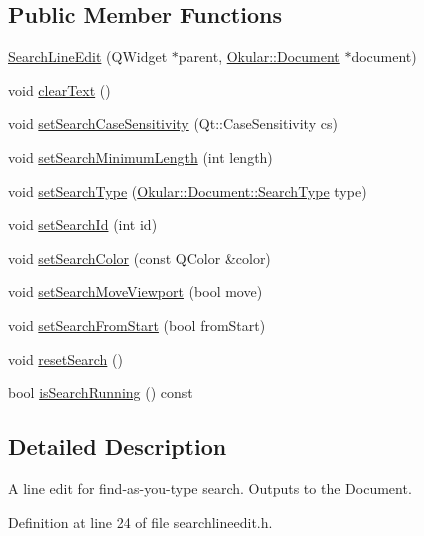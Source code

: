 \subsection*{Public Member Functions}
\begin{DoxyCompactItemize}
\item 
\hyperlink{classSearchLineEdit_a95f47f20abbe33e2085ed00a72ea765b}{Search\+Line\+Edit} (Q\+Widget $\ast$parent, \hyperlink{classOkular_1_1Document}{Okular\+::\+Document} $\ast$document)
\item 
void \hyperlink{classSearchLineEdit_a0fa7ecbad0c728472a16d7f0d22bcf6f}{clear\+Text} ()
\item 
void \hyperlink{classSearchLineEdit_a81cd95f5a0bf612d83f4ead3999d926b}{set\+Search\+Case\+Sensitivity} (Qt\+::\+Case\+Sensitivity cs)
\item 
void \hyperlink{classSearchLineEdit_a2743adac78c82e7651e68807e88b3cbf}{set\+Search\+Minimum\+Length} (int length)
\item 
void \hyperlink{classSearchLineEdit_a8dc6fe77273e78adf9c95c641ef1de2b}{set\+Search\+Type} (\hyperlink{classOkular_1_1Document_af4b4b32563d6013d6da10be1667a7bad}{Okular\+::\+Document\+::\+Search\+Type} type)
\item 
void \hyperlink{classSearchLineEdit_a00ff87a591108a7a3cad4c29b062e9d2}{set\+Search\+Id} (int id)
\item 
void \hyperlink{classSearchLineEdit_ae3ebd6c29d91280797bed839c92b8c82}{set\+Search\+Color} (const Q\+Color \&color)
\item 
void \hyperlink{classSearchLineEdit_a0e5c287135a1105de58f39d413621b8e}{set\+Search\+Move\+Viewport} (bool move)
\item 
void \hyperlink{classSearchLineEdit_aa077e673ca3fb3f9cc5460e26ee204de}{set\+Search\+From\+Start} (bool from\+Start)
\item 
void \hyperlink{classSearchLineEdit_aaa00080612fff4fee4397d6a45a83fc3}{reset\+Search} ()
\item 
bool \hyperlink{classSearchLineEdit_a938b0db074e98a6653f6486f48dc85e7}{is\+Search\+Running} () const 
\end{DoxyCompactItemize}


\subsection{Detailed Description}
A line edit for find-\/as-\/you-\/type search. Outputs to the Document. 

Definition at line 24 of file searchlineedit.\+h.



